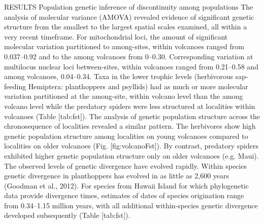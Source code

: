 \documentclass[12pt]{article}
\begin{document}
\begin{linenumbers}
RESULTS
Population genetic inference of discontinuity among populations
The analysis of molecular variance (AMOVA) revealed evidence of significant genetic structure from the smallest to the largest spatial scales examined, all within a very recent timeframe. For mitochondrial loci, the amount of significant molecular variation partitioned to among-sites, within volcanoes ranged from 0.037–0.92 and to the among volcanoes from 0–0.30. Corresponding variation at multilocus nuclear loci between-sites, within volcanoes ranged from 0.21–0.58 and among volcanoes, 0.04–0.34. Taxa in the lower trophic levels (herbivorous sap-feeding Hemiptera: planthoppers and psyllids) had as much or more molecular variation partitioned at the among-site, within volcano level than the among volcano level while the predatory spiders were less structured at localities within volcanoes (Table [tab:fst]). The analysis of genetic population structure across the chronosequence of localities revealed a similar pattern. The herbivores show high genetic population structure among localities on young volcanoes compared to localities on older volcanoes (Fig. [fig:volcanoFst]). By contrast, predatory spiders exhibited higher genetic population structure only on older volcanoes (e.g. Maui).
The observed levels of genetic divergence have evolved rapidly. Within species genetic divergence in planthoppers has evolved in as little as 2,600 years (Goodman et al., 2012). For species from Hawaii Island for which phylogenetic data provide divergence times, estimates of dates of species origination range from 0.34–1.15 million years, with all additional within-species genetic divergence developed subsequently (Table [tab:fst]).


\end{linenumbers}
\end{document}
